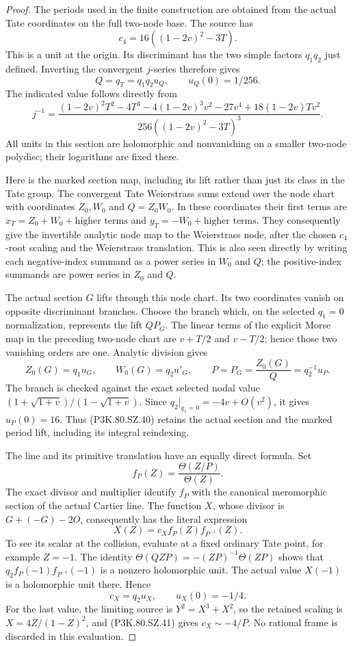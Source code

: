 \begin{proof}
The periods used in the finite construction are obtained from the actual
Tate coordinates on the full two-node base. The source has
\[
 c_4=16((1-2v)^2-3T).
\]
This is a unit at the origin. Its discriminant has the two simple
factors \(q_1q_2\) just defined. Inverting the convergent \(j\)-series
therefore gives
\[
 Q=q_T=q_1q_2u_Q,\qquad u_Q(0)=1/256.                 \tag{P3K.80.SZ.39}
\]
The indicated value follows directly from
\[
 j^{-1}=
 \frac{(1-2v)^2T^2-4T^3-4(1-2v)^3v^2-27v^4+
          18(1-2v)Tv^2}
 {256((1-2v)^2-3T)^3}.
\]
All units in this section are holomorphic and nonvanishing on a
smaller two-node polydisc; their logarithms are fixed there.

Here is the marked section map, including its lift rather than just
its class in the Tate group. The convergent Tate Weierstrass sums
extend over the node chart with coordinates \(Z_0,W_0\) and
\(Q=Z_0W_0\). In these coordinates their first terms are
\(x_T=Z_0+W_0+\text{higher terms}\) and
\(y_T=-W_0+\text{higher terms}\). They consequently give the
invertible analytic node map to the Weierstrass node, after the
chosen \(c_4\)-root scaling and the Weierstrass translation. This is
also seen directly by writing each negative-index summand as a
power series in \(W_0\) and \(Q\); the positive-index summands are
power series in \(Z_0\) and \(Q\).

The actual section \(G\) lifts through this node chart. Its two
coordinates vanish on opposite discriminant branches. Choose the
branch which, on the selected \(q_1=0\) normalization, represents
the lift \(Q P_G\). The linear terms of the explicit Morse map in
the preceding two-node chart are \(v+T/2\) and \(v-T/2\); hence those two vanishing
orders are one. Analytic division gives
\[
 Z_0(G)=q_1u_G,\qquad W_0(G)=q_2u'_G,\qquad
 P=P_G=\frac{Z_0(G)}Q=q_2^{-1}u_P.                   \tag{P3K.80.SZ.40}
\]
The branch is checked against the exact selected nodal value
\((1+\sqrt{1+v})/(1-\sqrt{1+v})\). Since
\(q_2|_{q_1=0}=-4v+O(v^2)\), it gives \(u_P(0)=16\).
Thus (P3K.80.SZ.40) retains the actual section and the marked period
lift, including its integral reindexing.

The line and its primitive translation have an equally direct
formula. Set
\[
 f_P(Z)=\frac{\Theta(Z/P)}{\Theta(Z)}.
\]
The exact divisor and multiplier identify \(f_P\) with the
canonical meromorphic section of the actual Cartier line. The
function \(X\), whose divisor is \(G+(-G)-2O\), consequently has
the literal expression
\[
 X(Z)=c_X f_P(Z)f_{P^{-1}}(Z).                       \tag{P3K.80.SZ.41}
\]
To see its scalar at the collision, evaluate at a fixed ordinary
Tate point, for example \(Z=-1\). The identity
\(\Theta(QZP)=-(ZP)^{-1}\Theta(ZP)\) shows that
\(q_2 f_P(-1)f_{P^{-1}}(-1)\) is a nonzero holomorphic
unit. The actual value \(X(-1)\) is a holomorphic unit there.
Hence
\[
                         c_X=q_2u_X,\qquad u_X(0)=-1/4 .
                                                               \tag{P3K.80.SZ.42}
\]
For the last value, the limiting source is
\(Y^2=X^3+X^2\), so the retained scaling is
\(X=4Z/(1-Z)^2\), and (P3K.80.SZ.41) gives \(c_X\sim-4/P\).
No rational frame is discarded in this evaluation.


\end{proof}
